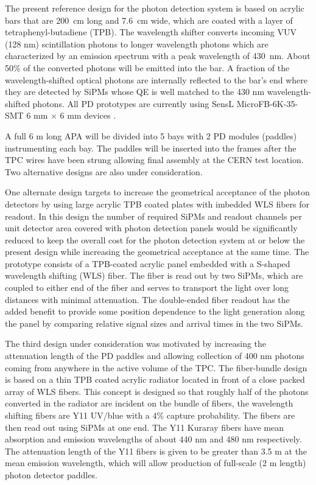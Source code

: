 The present reference design for the photon detection system is based on acrylic bars that are 200~cm long and 7.6~cm wide, which are coated with a layer of tetraphenyl-butadiene (TPB). The wavelength shifter converts incoming VUV (128 nm) scintillation photons
to longer wavelength photons which are characterized by an emission spectrum with a peak wavelength of 430~nm.
About 50\% of the converted photons will be emitted into the bar.
  A fraction of the wavelength-shifted optical photons are internally reflected to the bar's end where they are detected by SiPMs whose QE is well matched to the 430 nm wavelength-shifted photons. All PD prototypes are currently using SensL MicroFB-6K-35-SMT 6 mm $\times$ 6 mm devices \cite{sensl}. 

A full 6 m long APA will be divided into 5 bays with 2 PD modules (paddles) instrumenting each bay. The paddles will be inserted into the frames after the TPC wires have been strung allowing  final assembly at the CERN test location. Two alternative designs are also under consideration. 


One alternate design targets to increase the geometrical acceptance of the photon detectors by using large acrylic TPB coated plates with imbedded WLS fibers for readout. In this design the number of required SiPMs and readout channels per unit detector area covered with photon detection panels would be significantly reduced to keep the overall cost for the photon detection system at or below the present design while increasing the geometrical acceptance at the same time. The prototype consists of a TPB-coated acrylic panel embedded with a S-shaped wavelength shifting (WLS) fiber. The fiber is read out by two SiPMs, which are coupled to either end of the fiber and serves to transport the light over long distances with minimal attenuation. The double-ended fiber readout has the added benefit to provide some position dependence to the light generation along the panel by comparing relative signal sizes and arrival times in the two SiPMs. 



The third design under consideration was motivated by increasing the attenuation length of the PD paddles and allowing collection of 400 nm photons coming from anywhere in the active volume of the TPC.  The fiber-bundle design is based on a thin TPB coated acrylic radiator located in front of a close packed array of WLS fibers. This concept is designed so that roughly half of the photons converted in the radiator are incident on the bundle of fibers, the wavelength shifting fibers are Y11 UV/blue with a 4\% capture probability. The fibers are then read out using SiPMs at one end. The Y11  Kuraray fibers have mean absorption and emission wavelengths of about 440 nm and 480 nm respectively.  The attenuation length of the Y11 fibers is given to be greater than 3.5 m at the mean emission wavelength, which will allow production of full-scale (2 m length) photon detector paddles.


